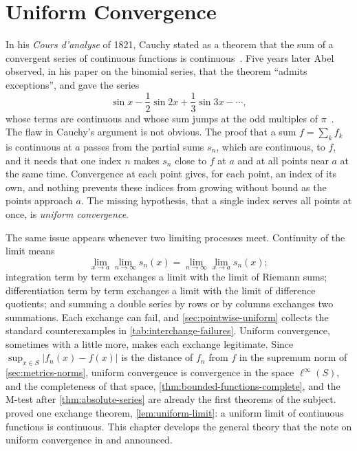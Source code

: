 \chapter{Uniform Convergence}
\label{ch:uniform-convergence}


In his \emph{Cours d'analyse} of 1821, Cauchy stated as a theorem that the sum of a convergent series of continuous functions is continuous~\cite{cauchy1821}. Five years later Abel observed, in his paper on the binomial series, that the theorem ``admits exceptions'', and gave the series
\[
\sin x-\frac12\sin2x+\frac13\sin3x-\cdots,
\]
whose terms are continuous and whose sum jumps at the odd multiples of $\pi$~\cite{abel1826}. The flaw in Cauchy's argument is not obvious. The proof that a sum $f=\sum_kf_k$ is continuous at $a$ passes from the partial sums $s_n$, which are continuous, to $f$, and it needs that one index $n$ makes $s_n$ close to $f$ at $a$ and at all points near $a$ at the same time. Convergence at each point gives, for each point, an index of its own, and nothing prevents these indices from growing without bound as the points approach $a$. The missing hypothesis, that a single index serves all points at once, is \emph{uniform convergence}.

The same issue appears whenever two limiting processes meet. Continuity of the limit means
\[
\lim_{x\to a}\lim_{n\to\infty}s_n(x)=\lim_{n\to\infty}\lim_{x\to a}s_n(x);
\]
integration term by term exchanges a limit with the limit of Riemann sums; differentiation term by term exchanges a limit with the limit of difference quotients; and summing a double series by rows or by columns exchanges two summations. Each exchange can fail, and \cref{sec:pointwise-uniform} collects the standard counterexamples in \cref{tab:interchange-failures}. Uniform convergence, sometimes with a little more, makes each exchange legitimate. Since $\sup_{x\in S}|f_n(x)-f(x)|$ is the distance of $f_n$ from $f$ in the supremum norm of \cref{sec:metrics-norms}, uniform convergence is convergence in the space $\ell^\infty(S)$, and the completeness of that space, \cref{thm:bounded-functions-complete}, and the M-test after \cref{thm:absolute-series} are already the first theorems of the subject.  proved one exchange theorem, \cref{lem:uniform-limit}: a uniform limit of continuous functions is continuous. This chapter develops the general theory that the note on uniform convergence in  and  announced.

